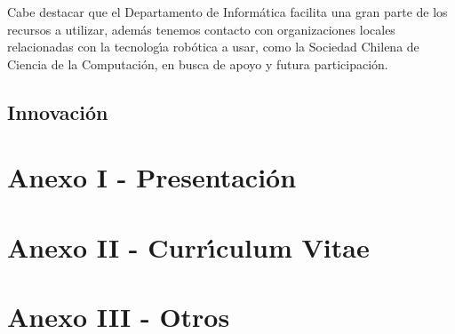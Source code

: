 \documentclass[letterpaper,12pt]{report} %
\numberwithin{equation}{section} %
\numberwithin{figure}{section} %
\numberwithin{table}{section} %
\begin{document}
Cabe destacar que el Departamento de Inform\'atica facilita una gran parte de los recursos a utilizar, adem\'as tenemos contacto con organizaciones locales relacionadas con la tecnolog\'{\i}a rob\'otica a usar, como la Sociedad Chilena de Ciencia de la Computaci\'on, en busca de apoyo y futura participaci\'on.\\
\newpage
\section{Innovaci\'on}

\newpage
\chapter*{Anexo I - Presentaci\'on} %

\newpage
\chapter*{Anexo II - Curr\'{\i}culum Vitae} %




\newpage
\chapter*{Anexo III - Otros} %
\end{document}
